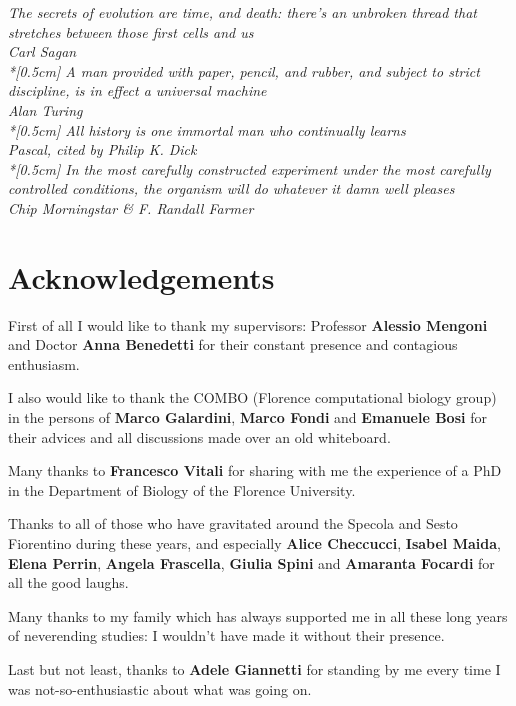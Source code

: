 
\thispagestyle{empty}

\begin{flushright}{\slshape
	\textit{The secrets of evolution are time, and death: there's an unbroken thread that stretches between those first cells and us} \\
	Carl Sagan \\*[0.5cm]
	\textit{A man provided with paper, pencil, and rubber, and subject to strict discipline, is in effect a universal machine} \\
	Alan Turing \\*[0.5cm]
	\textit{All history is one immortal man who continually learns} \\
	Pascal, cited by Philip K. Dick \\*[0.5cm]
	\textit{In the most carefully constructed experiment under the most carefully controlled conditions, the organism will do whatever it damn well pleases}\\
	Chip Morningstar \& F. Randall Farmer}
\end{flushright}



\newpage

\begingroup
\let\clearpage\relax
\let\cleardoublepage\relax
\let\cleardoublepage\relax

\chapter{Acknowledgements}

First of all I would like to thank my supervisors: Professor \textbf{Alessio Mengoni} and Doctor \textbf{Anna Benedetti} for their constant presence and contagious enthusiasm.

I also would like to thank the COMBO (Florence computational biology group) in the persons of \textbf{Marco Galardini}, \textbf{Marco Fondi} and \textbf{Emanuele Bosi} for their advices and all discussions made over an old whiteboard.

Many thanks to \textbf{Francesco Vitali} for sharing with me the experience of a PhD in the Department of Biology of the Florence University.

Thanks to all of those who have gravitated around the Specola and Sesto Fiorentino during these years, and especially \textbf{Alice Checcucci}, \textbf{Isabel Maida}, \textbf{Elena Perrin}, \textbf{Angela Frascella}, \textbf{Giulia Spini} and \textbf{Amaranta Focardi} for all the good laughs.

Many thanks to my family which has always supported me in all these long years of neverending studies: I wouldn't have made it without their presence.

Last but not least, thanks to \textbf{Adele Giannetti} for standing by me every time I was not-so-enthusiastic about what was going on.

\endgroup



